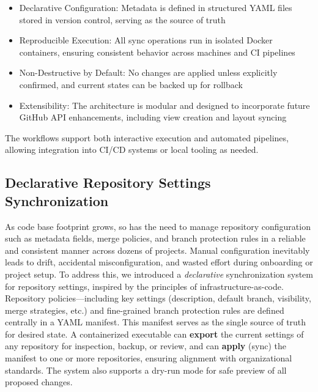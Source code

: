 \begin{itemize}
  \item Declarative Configuration: Metadata is defined in structured
    YAML files stored in version control, serving as the source of truth

  \item Reproducible Execution: All sync operations run in isolated
    Docker containers, ensuring consistent behavior across machines and CI
    pipelines

  \item Non-Destructive by Default: No changes are applied unless
    explicitly confirmed, and current states can be backed up for rollback

  \item Extensibility: The architecture is modular and designed to
    incorporate future GitHub API enhancements, including view creation and
    layout syncing
\end{itemize}

The workflows support both interactive execution and automated pipelines,
allowing integration into CI/CD systems or local tooling as needed.

\subsection{Declarative Repository Settings Synchronization}

As code base footprint grows, so has the need to manage repository
configuration such as metadata fields, merge policies, and branch protection
rules in a reliable and consistent manner across dozens of projects. Manual
configuration inevitably leads to drift, accidental misconfiguration, and
wasted effort during onboarding or project setup. To address this, we
introduced a \textit{declarative} synchronization system for repository
settings, inspired by the principles of infrastructure-as-code. Repository
policies—including key settings (description, default branch, visibility, merge
strategies, etc.) and fine-grained branch protection rules are defined
centrally in a YAML manifest. This manifest serves as the single source of
truth for desired state. A containerized executable can \textbf{export} the
current settings of any repository for inspection, backup, or review, and can
\textbf{apply} (sync) the manifest to one or more repositories, ensuring
alignment with organizational standards. The system also supports a dry-run
mode for safe preview of all proposed changes.

